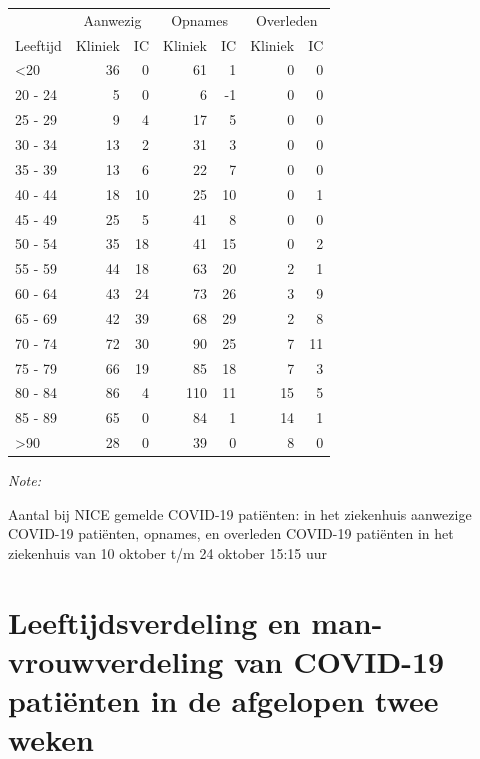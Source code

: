 \documentclass[
  english,
  man,floatsintext]{apa6}
\begin{document}
\begin{table}
\centering\begingroup\fontsize{10}{12}\selectfont

\begin{threeparttable}
\begin{tabular}{lrrrrrr}
\toprule
\multicolumn{1}{c}{ } & \multicolumn{2}{c}{Aanwezig} & \multicolumn{2}{c}{Opnames} & \multicolumn{2}{c}{Overleden} \\
\cmidrule(l{3pt}r{3pt}){2-3} \cmidrule(l{3pt}r{3pt}){4-5} \cmidrule(l{3pt}r{3pt}){6-7}
Leeftijd & Kliniek & IC & Kliniek & IC & Kliniek & IC\\
\midrule
<20 & 36 & 0 & 61 & 1 & 0 & 0\\
20 - 24 & 5 & 0 & 6 & -1 & 0 & 0\\
25 - 29 & 9 & 4 & 17 & 5 & 0 & 0\\
30 - 34 & 13 & 2 & 31 & 3 & 0 & 0\\
35 - 39 & 13 & 6 & 22 & 7 & 0 & 0\\
40 - 44 & 18 & 10 & 25 & 10 & 0 & 1\\
45 - 49 & 25 & 5 & 41 & 8 & 0 & 0\\
50 - 54 & 35 & 18 & 41 & 15 & 0 & 2\\
55 - 59 & 44 & 18 & 63 & 20 & 2 & 1\\
60 - 64 & 43 & 24 & 73 & 26 & 3 & 9\\
65 - 69 & 42 & 39 & 68 & 29 & 2 & 8\\
70 - 74 & 72 & 30 & 90 & 25 & 7 & 11\\
75 - 79 & 66 & 19 & 85 & 18 & 7 & 3\\
80 - 84 & 86 & 4 & 110 & 11 & 15 & 5\\
85 - 89 & 65 & 0 & 84 & 1 & 14 & 1\\
>90 & 28 & 0 & 39 & 0 & 8 & 0\\
\bottomrule
\end{tabular}
\begin{tablenotes}
\item \textit{Note: } 
\item Aantal bij NICE gemelde COVID-19 patiënten: in het ziekenhuis aanwezige COVID-19 patiënten, opnames, en overleden COVID-19 patiënten in het ziekenhuis van 10 oktober t/m 24 oktober 15:15 uur
\end{tablenotes}
\end{threeparttable}
\endgroup{}
\end{table}

\newpage

\hypertarget{leeftijdsverdeling-en-man-vrouwverdeling-van-covid-19-patiuxebnten-in-de-afgelopen-twee-weken}{%
\section{Leeftijdsverdeling en man-vrouwverdeling van COVID-19 patiënten in de afgelopen twee weken}\label{leeftijdsverdeling-en-man-vrouwverdeling-van-covid-19-patiuxebnten-in-de-afgelopen-twee-weken}}
\end{document}
